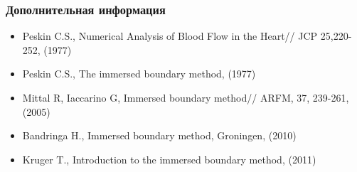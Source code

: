 \documentclass[14pt]{beamer}
\begin{document}
\begin{frame}
\frametitle{Дополнительная информация}
    \begin{itemize}
        \item Peskin C.S., Numerical Analysis of Blood Flow in the Heart// JCP 25,220-252, (1977)
        \item Peskin C.S., The immersed boundary method, (1977)
        \item Mittal R, Iaccarino G, Immersed boundary method// ARFM, 37, 239-261, (2005)
        \item Bandringa H., Immersed boundary method, Groningen, (2010)
        \item Kruger T., Introduction to the immersed boundary method, (2011)
    \end{itemize}
\end{frame}
\end{document}
